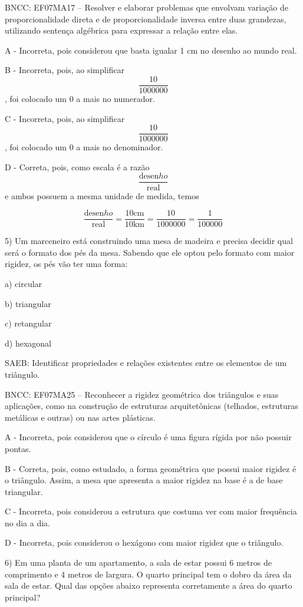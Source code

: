 BNCC: EF07MA17 -- Resolver e elaborar problemas que envolvam variação de
proporcionalidade direta e de proporcionalidade inversa entre duas
grandezas, utilizando sentença algébrica para expressar a relação entre
elas.

A - Incorreta, pois considerou que basta igualar 1 cm no desenho ao
mundo real.

B - Incorreta, pois, ao simplificar \[\frac{10}{1000000}\], foi colocado
um 0 a mais no numerador.

C - Incorreta, pois, ao simplificar \[\frac{10}{1000000}\], foi colocado
um 0 a mais no denominador.

D - Correta, pois, como escala é a razão
\[\frac{\text{desen}ho}{\text{real}}\] e ambos possuem a mesma unidade
de medida, temos

\[\frac{\text{desen}ho}{\text{real}} = \frac{10\text{cm}}{10\text{km}} = \frac{10}{1000000} = \frac{1}{100000}\]

5) Um marceneiro está construindo uma mesa de madeira e precisa decidir
qual será o formato dos pés da mesa. Sabendo que ele optou pelo formato
com maior rigidez, os pés vão ter uma forma:

a) circular

b) triangular

c) retangular

d) hexagonal

SAEB: Identificar propriedades e relações existentes entre os elementos
de um triângulo.

BNCC: EF07MA25 -- Reconhecer a rigidez geométrica dos triângulos e suas
aplicações, como na construção de estruturas arquitetônicas (telhados,
estruturas metálicas e outras) ou nas artes plásticas.

A - Incorreta, pois considerou que o círculo é uma figura rígida por não
possuir pontas.

B - Correta, pois, como estudado, a forma geométrica que possui maior
rigidez é o triângulo. Assim, a mesa que apresenta a maior rigidez na
base é a de base triangular.

C - Incorreta, pois considerou a estrutura que costuma ver com maior
frequência no dia a dia.

D - Incorreta, pois considerou o hexágono com maior rigidez que o
triângulo.

6) Em uma planta de um apartamento, a sala de estar possui 6 metros de
comprimento e 4 metros de largura. O quarto principal tem o dobro da
área da sala de estar. Qual das opções abaixo representa corretamente a
área do quarto principal?

